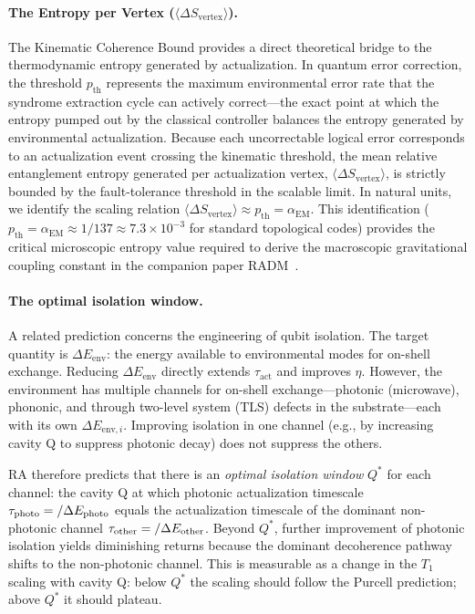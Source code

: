 \documentclass[11pt,a4paper]{article}
\theoremstyle{plain}
\theoremstyle{definition}
\theoremstyle{remark}
\begin{document}
\paragraph{The Entropy per Vertex ($\langle\Delta S_{\mathrm{vertex}}\rangle$).}
The Kinematic Coherence Bound provides a direct theoretical bridge to the thermodynamic entropy generated by actualization. In quantum error correction, the threshold $p_{\mathrm{th}}$ represents the maximum environmental error rate that the syndrome extraction cycle can actively correct---the exact point at which the entropy pumped out by the classical controller balances the entropy generated by environmental actualization. Because each uncorrectable logical error corresponds to an actualization event crossing the kinematic threshold, the mean relative entanglement entropy generated per actualization vertex, $\langle\Delta S_{\mathrm{vertex}}\rangle$, is strictly bounded by the fault-tolerance threshold in the scalable limit. In natural units, we identify the scaling relation $\langle\Delta S_{\mathrm{vertex}}\rangle \approx p_{\mathrm{th}} = \alpha_{\mathrm{EM}}$. This identification ($p_{\mathrm{th}} = \alpha_{\mathrm{EM}} \approx 1/137 \approx 7.3\times10^{-3}$ for standard topological codes) provides the critical microscopic entropy value required to derive the macroscopic gravitational coupling constant in the companion paper RADM~\citep{Sandeman2026RADM}.

\paragraph{The optimal isolation window.}
A related prediction concerns the engineering of qubit isolation. The target
quantity is $\Delta E_{\mathrm{env}}$: the energy available to environmental modes
for on-shell exchange. Reducing $\Delta E_{\mathrm{env}}$ directly extends
$\tau_{\mathrm{act}}$ and improves $\eta$. However, the environment has multiple
channels for on-shell exchange---photonic (microwave), phononic, and through
two-level system (TLS) defects in the substrate---each with its own $\Delta
E_{\mathrm{env}, i}$. Improving isolation in one channel (e.g., by increasing
cavity Q to suppress photonic decay) does not suppress the others.

RA therefore predicts that there is an \emph{optimal isolation window} $Q^*$ for
each channel: the cavity Q at which photonic actualization timescale $\tau_{\rm
photo} = \hbar / \Delta E_{\rm photo}$ equals the actualization timescale of the
dominant non-photonic channel $\tau_{\rm other} = \hbar / \Delta E_{\rm other}$.
Beyond $Q^*$, further improvement of photonic isolation yields diminishing returns
because the dominant decoherence pathway shifts to the non-photonic channel. This
is measurable as a change in the $T_1$ scaling with cavity Q: below $Q^*$ the
scaling should follow the Purcell prediction; above $Q^*$ it should plateau.
\end{document}
